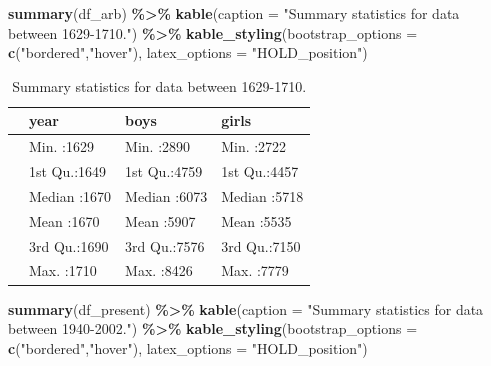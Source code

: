 \documentclass[11pt,a4paper,]{article}
\newenvironment{Shaded}{\begin{snugshade}}{\end{snugshade}}
\newcommand{\AttributeTok}[1]{\textcolor[rgb]{0.13,0.29,0.53}{#1}}
\newcommand{\FunctionTok}[1]{\textcolor[rgb]{0.13,0.29,0.53}{\textbf{#1}}}
\newcommand{\NormalTok}[1]{#1}
\newcommand{\SpecialCharTok}[1]{\textcolor[rgb]{0.81,0.36,0.00}{\textbf{#1}}}
\newcommand{\StringTok}[1]{\textcolor[rgb]{0.31,0.60,0.02}{#1}}
\begin{document}
\tiny

\begin{Shaded}
\begin{Highlighting}[]
\FunctionTok{summary}\NormalTok{(df\_arb) }\SpecialCharTok{\%\textgreater{}\%} \FunctionTok{kable}\NormalTok{(}\AttributeTok{caption =} \StringTok{"Summary statistics for data between 1629{-}1710."}\NormalTok{) }\SpecialCharTok{\%\textgreater{}\%} 
  \FunctionTok{kable\_styling}\NormalTok{(}\AttributeTok{bootstrap\_options =} \FunctionTok{c}\NormalTok{(}\StringTok{"bordered"}\NormalTok{,}\StringTok{"hover"}\NormalTok{),}
                                    \AttributeTok{latex\_options =} \StringTok{"HOLD\_position"}\NormalTok{) }
\end{Highlighting}
\end{Shaded}

\begin{table}[H]

\caption{\label{tab:sumstatarb}Summary statistics for data between 1629-1710.}
\centering
\begin{tabular}[t]{l|l|l|l}
\hline
  &      year &      boys &     girls\\
\hline
 & Min.   :1629 & Min.   :2890 & Min.   :2722\\
\hline
 & 1st Qu.:1649 & 1st Qu.:4759 & 1st Qu.:4457\\
\hline
 & Median :1670 & Median :6073 & Median :5718\\
\hline
 & Mean   :1670 & Mean   :5907 & Mean   :5535\\
\hline
 & 3rd Qu.:1690 & 3rd Qu.:7576 & 3rd Qu.:7150\\
\hline
 & Max.   :1710 & Max.   :8426 & Max.   :7779\\
\hline
\end{tabular}
\end{table}

\begin{Shaded}
\begin{Highlighting}[]
\FunctionTok{summary}\NormalTok{(df\_present) }\SpecialCharTok{\%\textgreater{}\%} \FunctionTok{kable}\NormalTok{(}\AttributeTok{caption =} \StringTok{"Summary statistics for data between 1940{-}2002."}\NormalTok{) }\SpecialCharTok{\%\textgreater{}\%} 
  \FunctionTok{kable\_styling}\NormalTok{(}\AttributeTok{bootstrap\_options =} \FunctionTok{c}\NormalTok{(}\StringTok{"bordered"}\NormalTok{,}\StringTok{"hover"}\NormalTok{),}
                                    \AttributeTok{latex\_options =} \StringTok{"HOLD\_position"}\NormalTok{) }
\end{Highlighting}
\end{Shaded}
\end{document}
